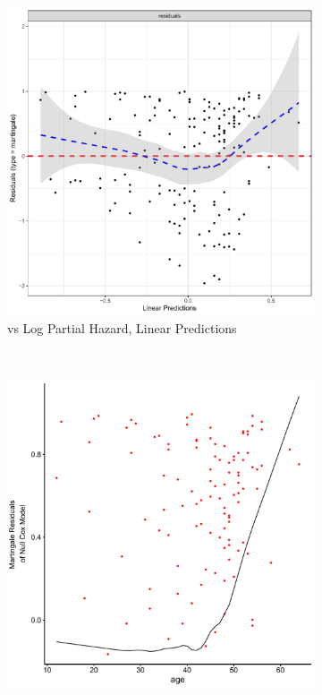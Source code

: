 \begin{figure}[H]
\centering
  \begin{subfigure}[c]{0.48\textwidth}\centering
  \includegraphics[width=\textwidth]{figures/survival/stanford_cox_age_martingale_residuals}
  \caption{vs Log Partial Hazard, \newline\ie Linear Predictions}
  \label{fig:cox:martingale_residuals:prediction}
  \end{subfigure}
  ~
  \begin{subfigure}[c]{0.48\textwidth}\centering
  \includegraphics[width=\textwidth]{figures/survival/stanford_cox_age_martingale_residuals_age}

\end{subfigure}
\end{figure}
